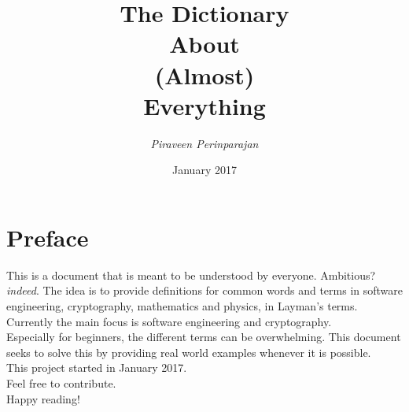 \documentclass[12pt]{report}
\begin{document}
\begin{titlepage}
\title{\textbf{The Dictionary \\ About \\ (Almost) \\ Everything} }
\author{\textit{Piraveen Perinparajan}}
\date{January 2017}
\end{titlepage}
\maketitle



\chapter*{Preface}  %
This is a document that is meant to be understood by everyone. Ambitious? \textit{indeed}. The idea is to provide definitions for common words and terms in software engineering, cryptography, mathematics and physics, in Layman's terms. Currently the main focus is software engineering and cryptography. \\

\noindent Especially for beginners, the different terms can be overwhelming. This document seeks to solve this by providing real world examples whenever it is possible. \\

\noindent This project started in January 2017. \\
\noindent Feel free to contribute.\\

\noindent Happy reading!


\clearpage
    \tableofcontents
\clearpage


\printglossary[title=Acronyms,type=\acronymtype]   %
\printglossary
\end{document}
